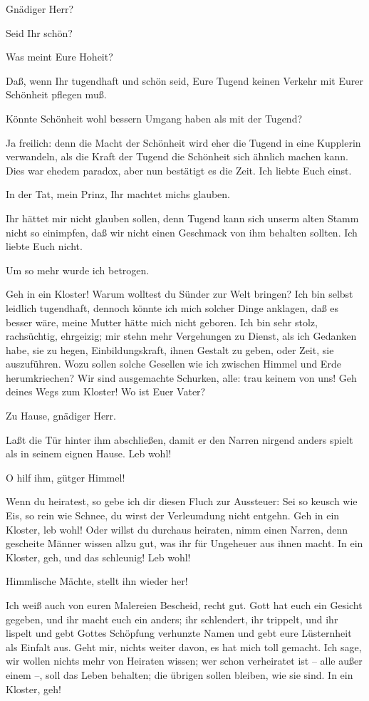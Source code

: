 Gnädiger Herr?

Seid Ihr schön?

Was meint Eure Hoheit?

Daß, wenn Ihr tugendhaft und schön seid, Eure Tugend keinen Verkehr mit Eurer
Schönheit pflegen muß.

Könnte Schönheit wohl bessern Umgang haben als mit der Tugend?

Ja freilich: denn die Macht der Schönheit wird eher die Tugend in eine
Kupplerin verwandeln, als die Kraft der Tugend die Schönheit sich ähnlich
machen kann. Dies war ehedem paradox, aber nun bestätigt es die Zeit. Ich
liebte Euch einst.

In der Tat, mein Prinz, Ihr machtet michs glauben.

Ihr hättet mir nicht glauben sollen, denn Tugend kann sich unserm alten Stamm
nicht so einimpfen, daß wir nicht einen Geschmack von ihm behalten sollten. Ich
liebte Euch nicht.

Um so mehr wurde ich betrogen.

Geh in ein Kloster! Warum wolltest du Sünder zur Welt bringen? Ich bin selbst
leidlich tugendhaft, dennoch könnte ich mich solcher Dinge anklagen, daß es
besser wäre, meine Mutter hätte mich nicht geboren. Ich bin sehr stolz,
rachsüchtig, ehrgeizig; mir stehn mehr Vergehungen zu Dienst, als ich Gedanken
habe, sie zu hegen, Einbildungskraft, ihnen Gestalt zu geben, oder Zeit, sie
auszuführen. Wozu sollen solche Gesellen wie ich zwischen Himmel und Erde
herumkriechen? Wir sind ausgemachte Schurken, alle: trau keinem von uns! Geh
deines Wegs zum Kloster! Wo ist Euer Vater?

Zu Hause, gnädiger Herr.

Laßt die Tür hinter ihm abschließen, damit er den Narren nirgend anders spielt
als in seinem eignen Hause. Leb wohl!

O hilf ihm, gütger Himmel!

Wenn du heiratest, so gebe ich dir diesen Fluch zur Aussteuer: Sei so keusch
wie Eis, so rein wie Schnee, du wirst der Verleumdung nicht entgehn. Geh in ein
Kloster, leb wohl! Oder willst du durchaus heiraten, nimm einen Narren, denn
gescheite Männer wissen allzu gut, was ihr für Ungeheuer aus ihnen macht. In
ein Kloster, geh, und das schleunig! Leb wohl!

Himmlische Mächte, stellt ihn wieder her!

Ich weiß auch von euren Malereien Bescheid, recht gut. Gott hat euch ein
Gesicht gegeben, und ihr macht euch ein anders; ihr schlendert, ihr trippelt,
und ihr lispelt und gebt Gottes Schöpfung verhunzte Namen und gebt eure
Lüsternheit als Einfalt aus. Geht mir, nichts weiter davon, es hat mich toll
gemacht. Ich sage, wir wollen nichts mehr von Heiraten wissen; wer schon
verheiratet ist -- alle außer einem --, soll das Leben behalten; die übrigen
sollen bleiben, wie sie sind. In ein Kloster, geh!

